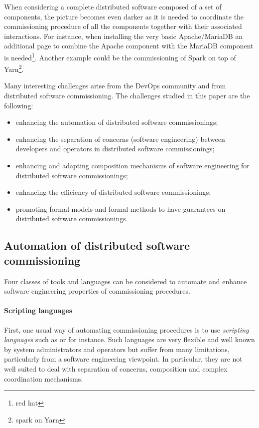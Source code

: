 When considering a complete distributed software composed of a set of
components, the picture becomes even darker as it is needed to
coordinate the commissioning procedure of all the components together
with their associated interactions. For instance, when installing the
very basic Apache/MariaDB an additional page to combine the Apache
component with the MariaDB component is needed\footnote{red
  hat}. Another example could be the commissioning of Spark on top of
Yarn\footnote{spark on Yarn}.

Many interesting challenges arise from the DevOps community and from
distributed software commissioning. The challenges studied in this
paper are the following:
\begin{itemize}
\item enhancing the automation of distributed software commissionings;
\item enhancing the separation of concerns (software engineering)
  between developers and operators in distributed software
  commissionings;
\item enhancing and adapting composition mechanisms of software
  engineering for distributed software commissionings;
\item enhancing the efficiency of distributed software commissionings;
\item promoting formal models and formal methods to have guarantees on
  distributed software commissionings.
\end{itemize}

\subsection{Automation of distributed software commissioning}

Four classes of tools and languages can be considered to automate and
enhance software engineering properties of commissioning procedures.

\paragraph{Scripting languages}
First, one usual way of automating commissioning procedures is to use
\emph{scripting languages} such as \shell or \ruby for instance. Such
languages are very flexible and well known by system administrators
and operators but suffer from many limitations, particularly from a
software engineering viewpoint. In particular, they are not well
suited to deal with separation of concerns, composition and complex
coordination mechanisms.

